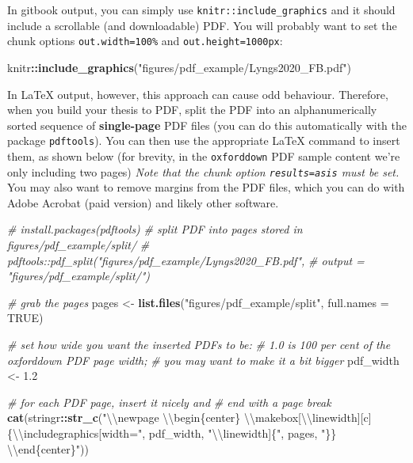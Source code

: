 \documentclass[a4paper, twoside]{templates/ociamthesis}
\newenvironment{Shaded}{\begin{snugshade}}{\end{snugshade}}
\newcommand{\CharTok}[1]{\textcolor[rgb]{0.31,0.60,0.02}{#1}}
\newcommand{\CommentTok}[1]{\textcolor[rgb]{0.56,0.35,0.01}{\textit{#1}}}
\newcommand{\DataTypeTok}[1]{\textcolor[rgb]{0.13,0.29,0.53}{#1}}
\newcommand{\FloatTok}[1]{\textcolor[rgb]{0.00,0.00,0.81}{#1}}
\newcommand{\KeywordTok}[1]{\textcolor[rgb]{0.13,0.29,0.53}{\textbf{#1}}}
\newcommand{\NormalTok}[1]{#1}
\newcommand{\OperatorTok}[1]{\textcolor[rgb]{0.81,0.36,0.00}{\textbf{#1}}}
\newcommand{\OtherTok}[1]{\textcolor[rgb]{0.56,0.35,0.01}{#1}}
\newcommand{\StringTok}[1]{\textcolor[rgb]{0.31,0.60,0.02}{#1}}
\renewenvironment{Shaded}
{
  \vspace{4pt}%
  \begin{snugshade}%
}{%
  \end{snugshade}%
  \vspace{4pt}%
}
\begin{document}
In gitbook output, you can simply use \texttt{knitr::include\_graphics} and it should include a scrollable (and downloadable) PDF.
You will probably want to set the chunk options \texttt{out.width=\textquotesingle{}100\%\textquotesingle{}} and \texttt{out.height=\textquotesingle{}1000px\textquotesingle{}}:

\begin{Shaded}
\begin{Highlighting}[]
\NormalTok{knitr}\OperatorTok{::}\KeywordTok{include_graphics}\NormalTok{(}\StringTok{"figures/pdf_example/Lyngs2020_FB.pdf"}\NormalTok{)}
\end{Highlighting}
\end{Shaded}

In LaTeX output, however, this approach can cause odd behaviour.
Therefore, when you build your thesis to PDF, split the PDF into an alphanumerically sorted sequence of \textbf{single-page} PDF files (you can do this automatically with the package \texttt{pdftools}). You can then use the appropriate LaTeX command to insert them, as shown below (for brevity, in the \texttt{oxforddown} PDF sample content we're only including two pages)
\emph{Note that the chunk option \texttt{results=\textquotesingle{}asis\textquotesingle{}} must be set.}
You may also want to remove margins from the PDF files, which you can do with Adobe Acrobat (paid version) and likely other software.

\begin{Shaded}
\begin{Highlighting}[]
\CommentTok{# install.packages(pdftools)}
\CommentTok{# split PDF into pages stored in figures/pdf_example/split/}
\CommentTok{# pdftools::pdf_split("figures/pdf_example/Lyngs2020_FB.pdf",}
\CommentTok{# output = "figures/pdf_example/split/")}

\CommentTok{# grab the pages}
\NormalTok{pages <-}\StringTok{ }\KeywordTok{list.files}\NormalTok{(}\StringTok{"figures/pdf_example/split"}\NormalTok{, }\DataTypeTok{full.names =} \OtherTok{TRUE}\NormalTok{)}

\CommentTok{# set how wide you want the inserted PDFs to be:}
\CommentTok{# 1.0 is 100 per cent of the oxforddown PDF page width;}
\CommentTok{# you may want to make it a bit bigger}
\NormalTok{pdf_width <-}\StringTok{ }\FloatTok{1.2}

\CommentTok{# for each PDF page, insert it nicely and}
\CommentTok{# end with a page break}
\KeywordTok{cat}\NormalTok{(stringr}\OperatorTok{::}\KeywordTok{str_c}\NormalTok{(}\StringTok{"}\CharTok{\textbackslash{}\textbackslash{}}\StringTok{newpage }\CharTok{\textbackslash{}\textbackslash{}}\StringTok{begin\{center\}}
\StringTok{    }\CharTok{\textbackslash{}\textbackslash{}}\StringTok{makebox[}\CharTok{\textbackslash{}\textbackslash{}}\StringTok{linewidth][c]\{}\CharTok{\textbackslash{}\textbackslash{}}\StringTok{includegraphics[width="}\NormalTok{, pdf_width,}
    \StringTok{"}\CharTok{\textbackslash{}\textbackslash{}}\StringTok{linewidth]\{"}\NormalTok{, pages, }\StringTok{"\}\} }\CharTok{\textbackslash{}\textbackslash{}}\StringTok{end\{center\}"}\NormalTok{))}
\end{Highlighting}
\end{Shaded}
\end{document}
